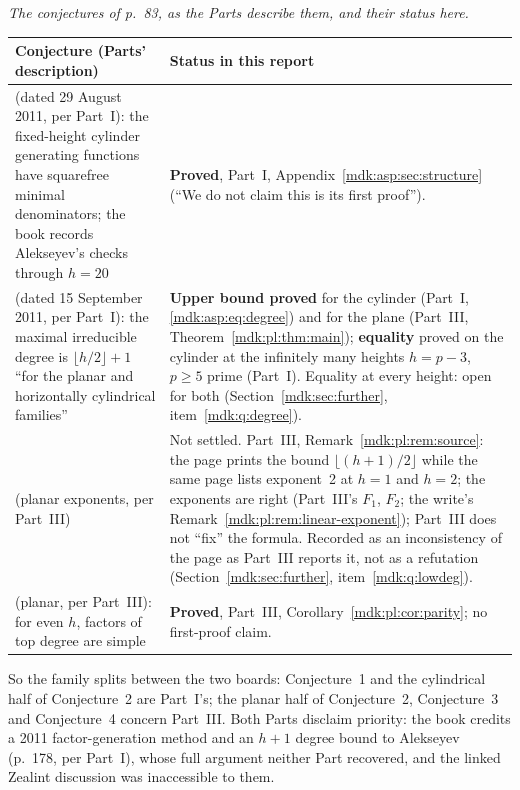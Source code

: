\documentclass[11pt,letterpaper]{article}
\numberwithin{equation}{section}
\theoremstyle{remark}\newtheorem{remark}[theorem]{Remark}
\begin{document}
\emph{The conjectures of p.~83, as the Parts describe them, and their status here.}
\begin{center}
\small
\begin{tabular}{@{}>{\raggedright\arraybackslash}p{} >{\raggedright\arraybackslash}p{}@{}}
\toprule
Conjecture (Parts' description) & Status in this report\\
\midrule
1 (dated 29 August 2011, per Part~I): the fixed-height cylinder generating functions have squarefree minimal denominators; the book records Alekseyev's checks through $h=20$ & \textbf{Proved}, Part~I, Appendix~\ref{mdk:asp:sec:structure} (``We do not claim this is its first proof'').\\
2 (dated 15 September 2011, per Part~I): the maximal irreducible degree is $\lfloor h/2\rfloor+1$ ``for the planar and horizontally cylindrical families'' & \textbf{Upper bound proved} for the cylinder (Part~I, \eqref{mdk:asp:eq:degree}) and for the plane (Part~III, Theorem~\ref{mdk:pl:thm:main}); \textbf{equality} proved on the cylinder at the infinitely many heights $h=p-3$, $p\ge5$ prime (Part~I). Equality at every height: open for both (Section~\ref{mdk:sec:further}, item~\ref{mdk:q:degree}).\\
3 (planar exponents, per Part~III) & Not settled. Part~III, Remark~\ref{mdk:pl:rem:source}: the page prints the bound $\lfloor(h+1)/2\rfloor$ while the same page lists exponent~2 at $h=1$ and $h=2$; the exponents are right (Part~III's $F_1$, $F_2$; the write's Remark~\ref{mdk:pl:rem:linear-exponent}); Part~III does not ``fix'' the formula. Recorded as an inconsistency of the page as Part~III reports it, not as a refutation (Section~\ref{mdk:sec:further}, item~\ref{mdk:q:lowdeg}).\\
4 (planar, per Part~III): for even $h$, factors of top degree are simple & \textbf{Proved}, Part~III, Corollary~\ref{mdk:pl:cor:parity}; no first-proof claim.\\
\bottomrule
\end{tabular}
\end{center}
So the family splits between the two boards: Conjecture~1 and the cylindrical half of Conjecture~2 are Part~I's; the planar half of Conjecture~2, Conjecture~3 and Conjecture~4 concern Part~III. Both Parts disclaim priority: the book credits a 2011 factor-generation method and an $h+1$ degree bound to Alekseyev (p.~178, per Part~I), whose full argument neither Part recovered, and the linked Zealint discussion \cite{zealint} was inaccessible to them.
\end{document}
